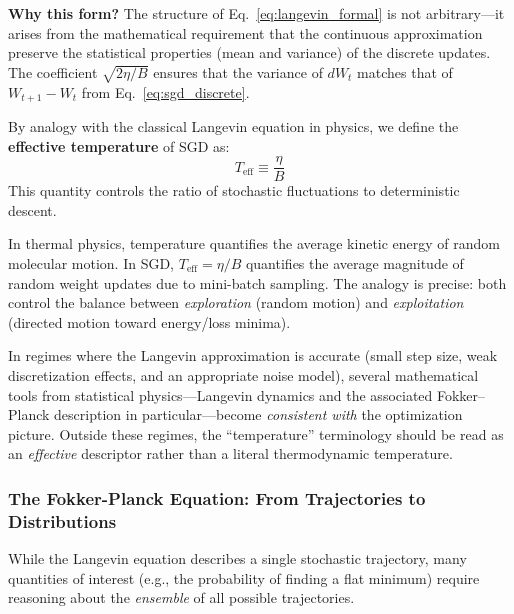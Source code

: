 \documentclass[
  journal=largetwo,
  simfonts=false,
  year=2025,
  volume=37,
]{cup-journal}
\begin{document}
\textbf{Why this form?} The structure of Eq.~\eqref{eq:langevin_formal} is not arbitrary---it arises from the mathematical requirement that the continuous approximation preserve the statistical properties (mean and variance) of the discrete updates. The coefficient $\sqrt{2\eta/B}$ ensures that the variance of $dW_t$ matches that of $W_{t+1} - W_t$ from Eq.~\eqref{eq:sgd_discrete}.

\begin{definition}\label{def:effective_temp}
By analogy with the classical Langevin equation in physics, we define the \textbf{effective temperature} of SGD as:
\begin{equation}
    T_{\text{eff}} \equiv \frac{\eta}{B}
\end{equation}
This quantity controls the ratio of stochastic fluctuations to deterministic descent.
\end{definition}

\begin{remark}
In thermal physics, temperature quantifies the average kinetic energy of random molecular motion. In SGD, $T_{\text{eff}} = \eta/B$ quantifies the average magnitude of random weight updates due to mini-batch sampling. The analogy is precise: both control the balance between \textit{exploration} (random motion) and \textit{exploitation} (directed motion toward energy/loss minima).

In regimes where the Langevin approximation is accurate (small step size, weak discretization effects, and an appropriate noise model), several mathematical tools from statistical physics---Langevin dynamics and the associated Fokker--Planck description in particular---become \emph{consistent with} the optimization picture. Outside these regimes, the ``temperature'' terminology should be read as an \textit{effective} descriptor rather than a literal thermodynamic temperature.
\end{remark}

\subsubsection{The Fokker-Planck Equation: From Trajectories to Distributions}

While the Langevin equation describes a single stochastic trajectory, many quantities of interest (e.g., the probability of finding a flat minimum) require reasoning about the \textit{ensemble} of all possible trajectories.
\end{document}
